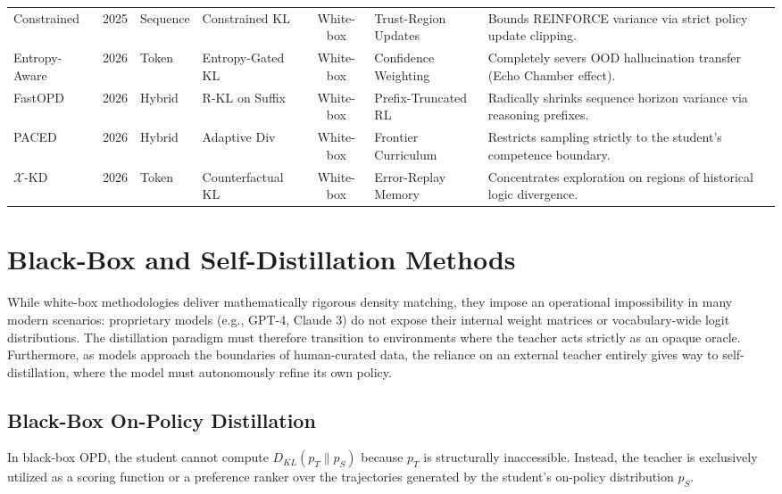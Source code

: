 \begin{table}[tbp]
{\begin{tabular}{l c l l c p{4cm} p{4.5cm}}
        Constrained \citep{2509.22921} & 2025 & Sequence & Constrained KL & White-box & Trust-Region Updates & Bounds REINFORCE variance via strict policy update clipping. \\
        Entropy-Aware \citep{2603.07079} & 2026 & Token & Entropy-Gated KL & White-box & Confidence Weighting & Completely severs OOD hallucination transfer (Echo Chamber effect). \\
        FastOPD \citep{2602.15260} & 2026 & Hybrid & R-KL on Suffix & White-box & Prefix-Truncated RL & Radically shrinks sequence horizon variance via reasoning prefixes. \\
        PACED \citep{2603.11178} & 2026 & Hybrid & Adaptive Div & White-box & Frontier Curriculum & Restricts sampling strictly to the student's competence boundary. \\
        $\mathcal{X}$-KD \citep{2602.12674} & 2026 & Token & Counterfactual KL & White-box & Error-Replay Memory & Concentrates exploration on regions of historical logic divergence. \\
        \bottomrule
    \end{tabular}
    }
\end{table}

\section{Black-Box and Self-Distillation Methods}
\label{sec:black_box}

While white-box methodologies deliver mathematically rigorous density matching, they impose an operational impossibility in many modern scenarios: proprietary models (e.g., GPT-4, Claude 3) do not expose their internal weight matrices or vocabulary-wide logit distributions. The distillation paradigm must therefore transition to environments where the teacher acts strictly as an opaque oracle. Furthermore, as models approach the boundaries of human-curated data, the reliance on an external teacher entirely gives way to self-distillation, where the model must autonomously refine its own policy.

\subsection{Black-Box On-Policy Distillation}
\label{subsec:black_box}

In black-box OPD, the student cannot compute $D_{KL}(p_T \parallel p_S)$ because $p_T$ is structurally inaccessible. Instead, the teacher is exclusively utilized as a scoring function or a preference ranker over the trajectories generated by the student's on-policy distribution $p_S$.

